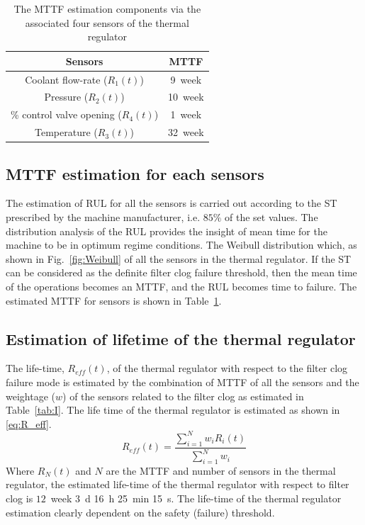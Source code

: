 \documentclass[conference]{IEEEtran}
\begin{document}
\begin{table}[b]
    \caption{The MTTF estimation components via the associated four sensors of the thermal regulator}
    \begin{center}
        \begin{tabular}{|c|c|}
            \hline
            \textbf{Sensors}& \textbf{MTTF} \\
            \hline
            Coolant flow-rate ($R_1(t)$) & \num{9}~week  \\
            \hline
            Pressure ($R_2(t)$) & \num{10}~week \\
            \hline
            \% control valve opening ($R_4(t)$) & \num{1}~week \\
            \hline
            Temperature ($R_3(t)$) & \num{32}~week \\
            \hline
        \end{tabular}
        \label{tab:III}
    \end{center}
\end{table}
\subsection{MTTF estimation for each sensors}
\label{subsec:MTTF}
The estimation of RUL for all the sensors is carried out according to the ST prescribed by the machine manufacturer, i.e. $85\%$ of the set values. The distribution analysis of the RUL provides the insight of mean time for the machine to be in optimum regime conditions. The Weibull distribution which, as shown in Fig.~\ref{fig:Weibull} of all the sensors in the thermal regulator. If the ST can be considered as the definite filter clog failure threshold, then the mean time of the operations becomes an MTTF, and the RUL becomes time to failure. The estimated MTTF for sensors is shown in Table~\ref{tab:III}.

\subsection{Estimation of lifetime of the thermal regulator}
\label{subsec:Lifetime}
The life-time, $R_{eff} (t)$, of the thermal regulator with respect to the filter clog failure mode is estimated by the combination of MTTF of all the sensors and the weightage ($w$) of the sensors related to the filter clog as estimated in Table~\ref{tab:I}. The life time of the thermal regulator is estimated as shown in \eqref{eq:R_eff}.
\begin{equation}
    R_{eff}(t) = \frac{\sum\limits_{i=1}^N w_i R_i(t)}{\sum\limits_{i=1}^N w_i}
    \label{eq:R_eff}
\end{equation}
Where $R_N (t)$ and $N$ are the MTTF and number of sensors in the thermal regulator, the estimated life-time of the thermal regulator with respect to filter clog is $12$~week \SI{3}{\day} \SI{16}{\hour} \SI{25}{\minute} \SI{15}{\second}. The life-time of the thermal regulator estimation clearly dependent on the safety (failure) threshold.
\end{document}
